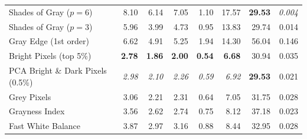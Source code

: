 \begin{longtable}{@{}>{\raggedright\arraybackslash}p{6.8cm}rrrrrrr@{}}
Shades of Gray ($p=6$)~\cite{shades_of_gray} & 8.10 & 6.14 & 7.05 & 1.10 & 17.57 & \textbf{29.53} & \textit{0.004} \\
Shades of Gray ($p=3$)~\cite{shades_of_gray} & 5.96 & 3.99 & 4.73 & 0.95 & 13.83 & 29.74 & 0.014 \\
Gray Edge (1st order)~\cite{gray_edge} & 6.62 & 4.91 & 5.25 & 1.94 & 14.30 & 56.04 & 0.146 \\
Bright Pixels (top 5\%)~\cite{bright_pixels} & \textbf{2.78} & \textbf{1.86} & \textbf{2.00} & \textbf{0.54} & \textbf{6.68} & 30.94 & 0.035 \\
PCA Bright \& Dark Pixels (0.5\%)~\cite{cheng2014illuminant} & \textit{2.98} & \textit{2.10} & \textit{2.26} & \textit{0.59} & \textit{6.92} & \textbf{29.53} & 0.021 \\
Grey Pixels~\cite{yangGrayPixels} & 3.06 & 2.21 & 2.31 & 0.64 & 7.05 & 31.75 & 0.028 \\
Grayness Index~\cite{qianFindingGrayPixels} & 3.56 & 2.62 & 2.74 & 0.75 & 8.12 & 37.18 & 0.023 \\
Fast White Balance~\cite{fast_wb_greyness} & 3.87 & 2.97 & 3.16 & 0.88 & 8.44 & 32.95 & 0.028 \\
\end{longtable}
\endgroup

